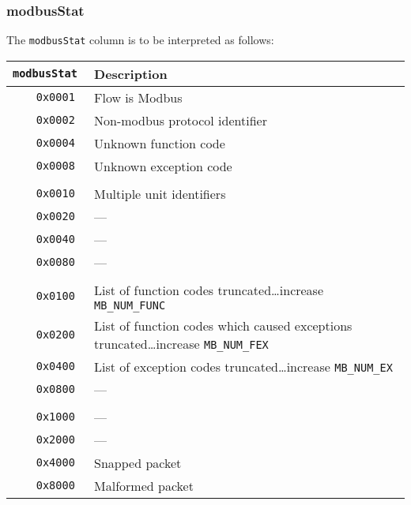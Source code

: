 \documentclass[documentation]{subfiles}
\begin{document}
\subsubsection{modbusStat}\label{modbusStat}
The {\tt modbusStat} column is to be interpreted as follows:
\begin{longtable}{>{\tt}rl}
    \toprule
    {\bf modbusStat} & {\bf Description}\\
    \midrule\endhead%
    0x0001 & Flow is Modbus\\
    0x0002 & Non-modbus protocol identifier\\
    0x0004 & Unknown function code\\
    0x0008 & Unknown exception code\\
    \\
    0x0010 & Multiple unit identifiers\\
    0x0020 & ---\\
    0x0040 & ---\\
    0x0080 & ---\\
    \\
    0x0100 & List of function codes truncated\ldots increase {\tt MB\_NUM\_FUNC}\\
    0x0200 & List of function codes which caused exceptions truncated\ldots increase {\tt MB\_NUM\_FEX}\\
    0x0400 & List of exception codes truncated\ldots increase {\tt MB\_NUM\_EX}\\
    0x0800 & ---\\
    \\
    0x1000 & ---\\
    0x2000 & ---\\
    0x4000 & Snapped packet\\
    0x8000 & Malformed packet\\
    \bottomrule
\end{longtable}
\end{document}
